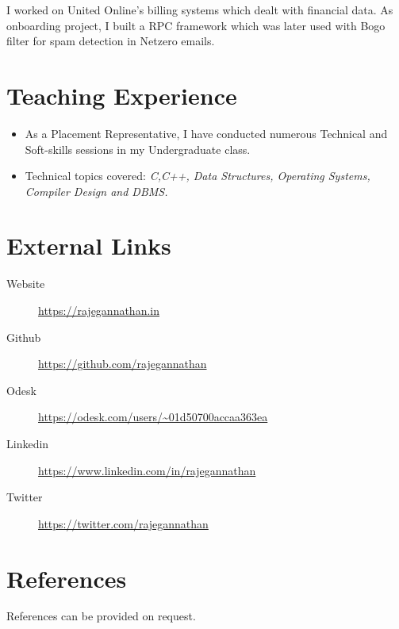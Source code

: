 \documentclass{cv}
\begin{document}
I worked on United Online's billing systems which dealt with financial data.  As onboarding project, I built a RPC framework which was later used with Bogo filter for spam detection in Netzero emails.


\section{Teaching Experience}
\begin{itemize}
  \item As a Placement Representative, I have conducted numerous Technical and Soft-skills sessions in my Undergraduate class.
  \item Technical topics covered: \textit{C,C++, Data Structures, Operating Systems, Compiler Design and DBMS.}
\end{itemize}

\section{External Links}
\begin{description}
  \item[Website] \url{https://rajegannathan.in}
  \item[Github] \url{https://github.com/rajegannathan}
  \item[Odesk] \url{https://odesk.com/users/~01d50700accaa363ea}
  \item[Linkedin] \url{https://www.linkedin.com/in/rajegannathan}
  \item[Twitter] \url{https://twitter.com/rajegannathan}
\end{description}

\section{References}
References can be provided on request.
\end{document}
